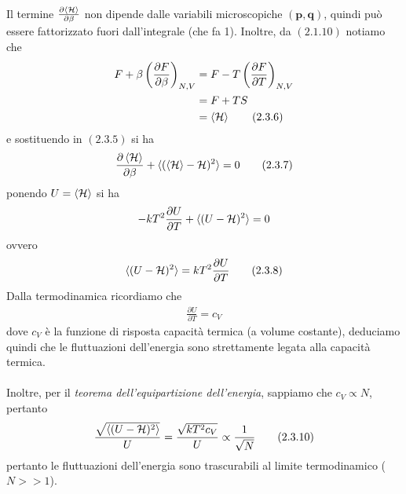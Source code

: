\documentclass{article}
\begin{document}
Il termine $\frac{\partial \braket{\mathcal{H}}}{\partial \beta}$ non dipende dalle variabili microscopiche $(\mathbf{p}, \mathbf{q})$, quindi può essere fattorizzato fuori dall'integrale (che fa 1). Inoltre, da $(2.1.10)$ notiamo che 
\begin{align}
    F + \beta\left(\frac{\partial F}{\partial \beta}\right)_{N, V} &= F - T\left(\frac{\partial F}{\partial T}\right)_{N, V} \notag \\
    &= F + TS \notag \\
    &= \braket{\mathcal{H}} \tag{2.3.6}
\end{align}
e sostituendo in $(2.3.5)$ si ha 
\begin{align}
    \frac{\partial \braket{\mathcal{H}}}{\partial \beta} + \braket{(\braket{\mathcal{H}} - \mathcal{H})^2} = 0 \tag{2.3.7}
\end{align}
ponendo $U = \braket{\mathcal{H}}$ si ha 
\begin{align}
    -kT^2\frac{\partial U}{\partial T} + \braket{(U - \mathcal{H})^2} = 0 \notag
\end{align}
ovvero 
\begin{align}
    \braket{(U - \mathcal{H})^2} = kT^2\frac{\partial U}{\partial T} \tag{2.3.8}
\end{align}
Dalla termodinamica ricordiamo che 
\begin{align}
    \frac{\partial U}{\partial T} = c_V \tag{2.3.9}
\end{align}
dove $c_V$ è la funzione di risposta capacità termica (a volume costante), deduciamo quindi che le fluttuazioni dell'energia sono strettamente legata alla capacità termica. \\ \\
Inoltre, per il \textit{teorema dell'equipartizione dell'energia}, sappiamo che $c_V \propto N$, pertanto
\begin{align}
    \frac{\sqrt{\braket{(U - \mathcal{H})^2}}}{U} = \frac{\sqrt{kT^2c_V}}{U} \propto \frac{1}{\sqrt{N}} \tag{2.3.10}
\end{align}
pertanto le fluttuazioni dell'energia sono trascurabili al limite termodinamico ($N >> 1$).

\newpage
\end{document}
